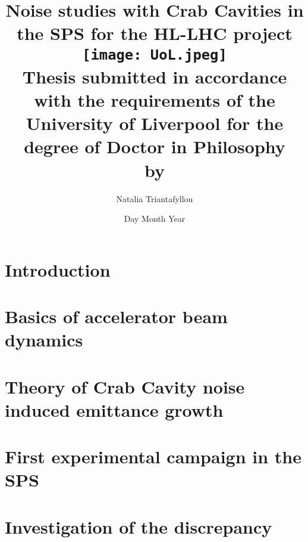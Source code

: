 \documentclass[12pt,twoside]{report} %
\begin{document}
\frontmatter
\title{
{Noise studies with Crab Cavities in the SPS for the HL-LHC project}\\
{\texttt{[image: UoL.jpeg]}} \\
{\large Thesis submitted in accordance with the requirements of the University of Liverpool for the degree of Doctor in Philosophy \\ by}
}
\author{ Natalia Triantafyllou}
\date{Day Month Year}
\maketitle
\newpage




\listoffigures
{}
\listoftables
{}

\newpage

\thispagestyle{plain} %

\listofsymbols
{}


\tableofcontents

\mainmatter

\chapter{Introduction}


\chapter{Basics of accelerator beam dynamics}


\chapter{Theory of Crab Cavity noise induced emittance growth}


\chapter{First experimental campaign in the SPS}


\chapter{Investigation of the discrepancy}

\end{document}
